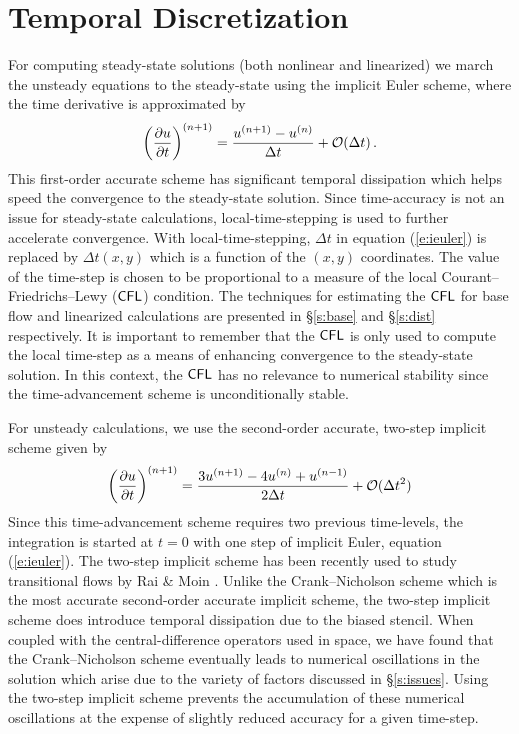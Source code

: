 \section{Temporal Discretization \label{s:temporal} }

For computing steady-state solutions (both nonlinear and linearized) we march
the unsteady equations to the steady-state using the implicit Euler scheme,
where the time derivative is approximated by
%
\begin{equation} \label{e:ieuler}
\left(\frac{\partial u}{\partial t}\right)^{(n+1)} =  
\frac{u^{(n+1)}-u^{(n)}}{\Delta t} + {\cal O}(\Delta t) {\, .}
\end{equation}
%
This first-order accurate scheme has significant temporal dissipation which
helps speed the convergence to the steady-state solution.  Since time-accuracy
is not an issue for steady-state calculations, local-time-stepping is used to
further accelerate convergence.  With local-time-stepping, $\Delta t$ in
equation (\ref{e:ieuler}) is replaced by $\Delta t(x,y)$ which is a function
of the $(x,y)$ coordinates.  The value of the time-step is chosen to be
proportional to a measure of the local Courant--Friedrichs--Lewy (${\sf CFL}$)
condition.  The techniques for estimating the ${\sf CFL}$ for base flow and
linearized calculations are presented in \S\ref{s:base} and \S\ref{s:dist}
respectively.  It is important to remember that the ${\sf CFL}$ is only used to
compute the local time-step as a means of enhancing convergence to the
steady-state solution.  In this context, the ${\sf CFL}$ has no relevance to
numerical stability since the time-advancement scheme is unconditionally
stable.

For unsteady calculations, we use the second-order accurate, two-step implicit
scheme given by
%
\begin{equation}
  \left(\frac{\partial u}{\partial t}\right)^{(n+1)} = 
  \frac{3u^{(n+1)}-4u^{(n)}+u^{(n-1)}}{2\Delta t} + {\cal O}(\Delta t^2)
\end{equation}
%
Since this time-advancement scheme requires two previous time-levels, the
integration is started at $t=0$ with one step of implicit Euler, equation
(\ref{e:ieuler}).  The two-step implicit scheme has been recently used to
study transitional flows by Rai \& Moin \cite{RaMo:93}.  Unlike the
Crank--Nicholson scheme which is the most accurate second-order accurate
implicit scheme, the two-step implicit scheme does introduce temporal
dissipation due to the biased stencil.  When coupled with the
central-difference operators used in space, we have found that the
Crank--Nicholson scheme eventually leads to numerical oscillations in the
solution which arise due to the variety of factors discussed in
\S\ref{s:issues}.  Using the two-step implicit scheme prevents the
accumulation of these numerical oscillations at the expense of slightly
reduced accuracy for a given time-step.

